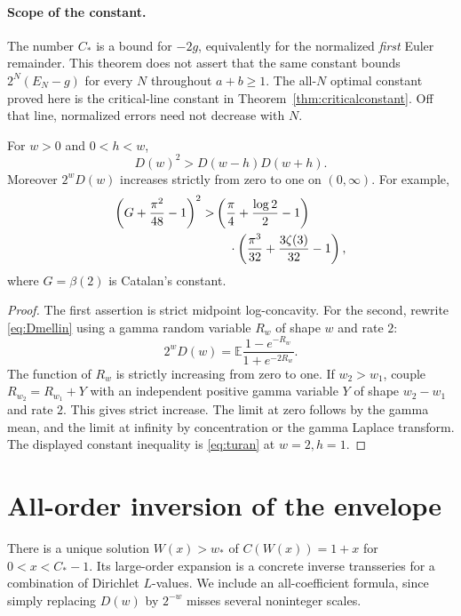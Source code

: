 \paragraph{Scope of the constant.}
The number $C_*$ is a bound for $-2g$, equivalently for the normalized
\emph{first} Euler remainder. This theorem does not assert that the same
constant bounds $2^N(E_N-g)$ for every $N$ throughout $a+b\ge1$.
The all-$N$ optimal constant proved here is the critical-line constant
in Theorem~\ref{thm:criticalconstant}. Off that line, normalized errors
need not decrease with $N$.

\begin{corollary}
\label{cor:turan}
For $w>0$ and $0<h<w$,
\begin{equation}\label{eq:turan}
 D(w)^2>D(w-h)D(w+h).
\end{equation}
Moreover $2^wD(w)$ increases strictly from zero to one on $(0,\infty)$.
For example,
\begin{align}\label{eq:catalanineq}
 \left(G+\frac{\pi^2}{48}-1\right)^2
 >&\left(\frac\pi4+\frac{\log2}{2}-1\right)\notag\\
 &\hspace{4mm}\cdot\left(\frac{\pi^3}{32}
                         +\frac{3\zeta(3)}{32}-1\right),
\end{align}
where $G=\beta(2)$ is Catalan's constant.
\end{corollary}
\begin{proof}
The first assertion is strict midpoint log-concavity. For the second,
rewrite \eqref{eq:Dmellin} using a gamma random variable $R_w$ of shape
$w$ and rate $2$:
\[
 2^wD(w)=\mathbb E\frac{1-e^{-R_w}}{1+e^{-2R_w}}.
\]
The function of $R_w$ is strictly increasing from zero to one. If
$w_2>w_1$, couple $R_{w_2}=R_{w_1}+Y$ with an independent positive gamma
variable $Y$ of shape $w_2-w_1$ and rate $2$. This gives strict increase.
The limit at zero follows by the gamma mean, and the limit at infinity
by concentration or the gamma Laplace transform. The displayed
constant inequality is \eqref{eq:turan} at $w=2,h=1$.
\end{proof}

\section{All-order inversion of the envelope}
\label{sec:inversion}

There is a unique solution $W(x)>w_*$ of $C(W(x))=1+x$ for
$0<x<C_*-1$. Its large-order expansion is a concrete inverse
transseries for a combination of Dirichlet $L$-values. We include
an all-coefficient formula, since simply replacing $D(w)$ by $2^{-w}$
misses several noninteger scales.

